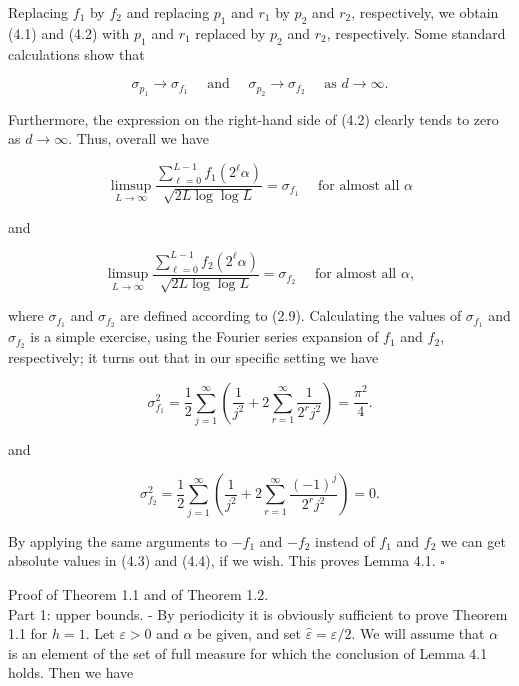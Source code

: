 \documentclass[10pt]{article}
\newcommand{\1}{\mathbf{1}}
\begin{document}
Replacing $f_{1}$ by $f_{2}$ and replacing $p_{1}$ and $r_{1}$ by $p_{2}$ and $r_{2}$, respectively, we obtain (4.1) and (4.2) with $p_{1}$ and $r_{1}$ replaced by $p_{2}$ and $r_{2}$, respectively. Some standard calculations show that

$$
\sigma_{p_{1}} \rightarrow \sigma_{f_{1}} \quad \text{ and } \quad \sigma_{p_{2}} \rightarrow \sigma_{f_{2}} \quad \text { as } d \rightarrow \infty .
$$

Furthermore, the expression on the right-hand side of (4.2) clearly tends to zero as $d \rightarrow \infty$. Thus, overall we have


\begin{equation*}
\limsup _{L \rightarrow \infty} \frac{\sum_{\ell=0}^{L-1} f_{1}\left(2^{\ell} \alpha\right)}{\sqrt{2 L \log \log L}}=\sigma_{f_{1}} \quad \text { for almost all } \alpha \tag{4.3}
\end{equation*}


and


\begin{equation*}
\limsup _{L \rightarrow \infty} \frac{\sum_{\ell=0}^{L-1} f_{2}\left(2^{\ell} \alpha\right)}{\sqrt{2 L \log \log L}}=\sigma_{f_{2}} \quad \text { for almost all } \alpha, \tag{4.4}
\end{equation*}


where $\sigma_{f_{1}}$ and $\sigma_{f_{2}}$ are defined according to (2.9). Calculating the values of $\sigma_{f_{1}}$ and $\sigma_{f_{2}}$ is a simple exercise, using the Fourier series expansion of $f_{1}$ and $f_{2}$, respectively; it turns out that in our specific setting we have


\begin{equation*}
\sigma_{f_1}^2
=\frac12\sum_{j=1}^{\infty}\left(\frac1{j^2}
 +2\sum_{r=1}^{\infty}\frac1{2^rj^2}\right)
=\frac{\pi^2}{4}. \tag{4.5}
\end{equation*}


and


\begin{equation*}
\sigma_{f_2}^2
=\frac12\sum_{j=1}^{\infty}\left(\frac1{j^2}
 +2\sum_{r=1}^{\infty}\frac{(-1)^j}{2^rj^2}\right)=0. \tag{4.6}
\end{equation*}


By applying the same arguments to $-f_{1}$ and $-f_{2}$ instead of $f_{1}$ and $f_{2}$ we can get absolute values in (4.3) and (4.4), if we wish. This proves Lemma 4.1. \(\square\)

Proof of Theorem 1.1 and of Theorem 1.2.\\
Part 1: upper bounds. - By periodicity it is obviously sufficient to prove Theorem 1.1 for $h=1$. Let $\varepsilon>0$ and $\alpha$ be given, and set $\hat{\varepsilon}=\varepsilon / 2$. We will assume that $\alpha$ is an element of the set of full measure for which the conclusion of Lemma 4.1 holds. Then we have
\end{document}

